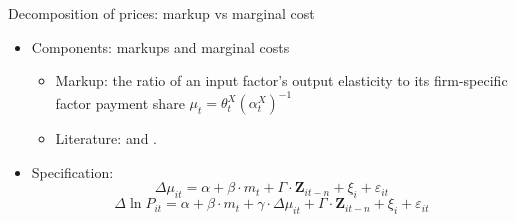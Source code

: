 \documentclass[10pt]{beamer}
\begin{document}
\begin{frame}{Decomposition of prices: markup vs marginal cost}
    \begin{itemize}
        \item Components: markups and marginal costs
        \begin{itemize}
            \item Markup: the ratio of an input factor's output elasticity to its firm-specific factor payment share $\mu_{t}=\theta_{t}^{X}\left(\alpha_{t}^{X}\right)^{-1}$
            \item Literature: \cite{deloecker2012markups} and \cite{brooks2021agglomeration}.
        \end{itemize}
        \item Specification: 
        \begin{equation}
            \Delta \mu_{it} = \alpha +\beta \cdot m_{t}+ \Gamma \cdot \textbf{Z}_{it-n}+\xi_{i}+\varepsilon_{it} \label{reg.markup}
        \end{equation}
        \begin{equation}
            \Delta \ln P_{it} = \alpha+\beta \cdot m_{t}+ \gamma \cdot \Delta \mu_{it}+ \Gamma \cdot \textbf{Z}_{it-n}+\xi_{i}+\varepsilon_{i t} \label{reg.markup_int}
        \end{equation}
    \end{itemize}
\end{frame}
\end{document}
